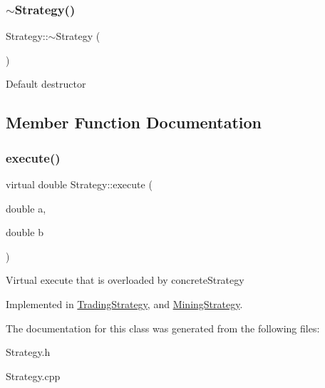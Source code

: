\subsubsection{\texorpdfstring{$\sim$\+Strategy()}{~Strategy()}}
{\footnotesize\ttfamily Strategy\+::$\sim$\+Strategy (\begin{DoxyParamCaption}{ }\end{DoxyParamCaption})}

Default destructor 

\subsection{Member Function Documentation}
\mbox{\label{classStrategy_a81b8d4f53494c438b21fc999c7ea59f4}} 
\subsubsection{\texorpdfstring{execute()}{execute()}}
{\footnotesize\ttfamily virtual double Strategy\+::execute (\begin{DoxyParamCaption}\item[{double}]{a,  }\item[{double}]{b }\end{DoxyParamCaption})\hspace{0.3cm}{\ttfamily [pure virtual]}}

Virtual execute that is overloaded by concrete\+Strategy 

Implemented in \hyperlink{classTradingStrategy_a4029029df708f9f0f013603b19f449ff}{Trading\+Strategy}, and \hyperlink{classMiningStrategy_ace2ad68881b60573b90921a8087aee75}{Mining\+Strategy}.



The documentation for this class was generated from the following files\+:\begin{DoxyCompactItemize}
\item 
Strategy.\+h\item 
Strategy.\+cpp\end{DoxyCompactItemize}
